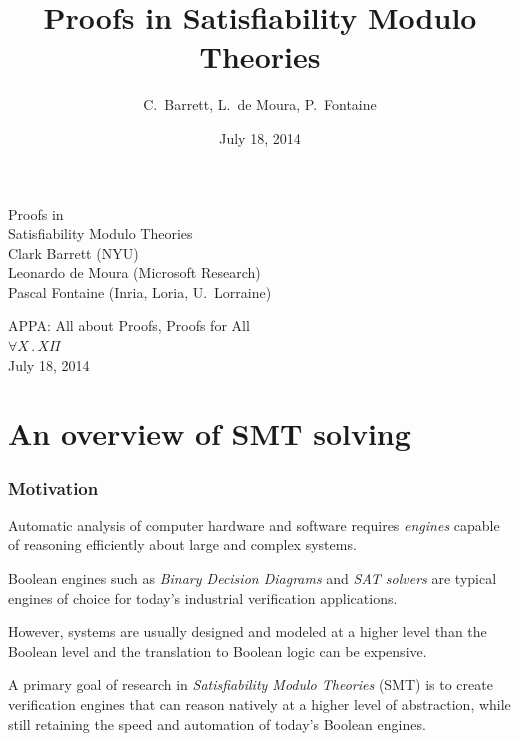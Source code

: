 \documentclass[svgnames,table,mathserif]{beamer}
\title{Proofs in Satisfiability Modulo Theories}
\author[]{C.~Barrett, L.~de Moura, P.~Fontaine}
\date{July 18, 2014}
\institute[]{%
}
\newcommand{\df}[1]{{\color{blue}\em{#1}}\xspace}
\begin{document}

\begin{frame}

  \begin{center}

  {\huge Proofs in\\[8pt] Satisfiability Modulo Theories}\\

  \vspace*{20pt}
  Clark Barrett (NYU)\\[2pt]
  Leonardo de Moura (Microsoft Research)\\[2pt]
  Pascal Fontaine (Inria, Loria, U.\ Lorraine)

  \vspace*{10PT}\large
  APPA: All about Proofs, Proofs for All\\
  $\forall X\,.\,X\Pi$\\[5pt] July 18, 2014%
  \end{center}
\end{frame}




\section{An overview of SMT solving}

\begin{frame}\frametitle{Motivation}

Automatic analysis of computer hardware and software requires \df{engines}
capable of reasoning efficiently about large and complex systems.
\medskip

Boolean engines such as \df{Binary Decision Diagrams} and \df{SAT solvers} 
are typical engines of choice for today's industrial verification applications.
\medskip

However, systems are usually designed and modeled at a higher level than the
Boolean level and the translation to Boolean logic can be expensive.
\medskip

A primary goal of research in \df{Satisfiability Modulo Theories} (SMT) is to create
verification engines that can reason natively at a higher level of abstraction,
while still retaining the speed and automation of today's Boolean engines.

\end{frame}
\end{document}
